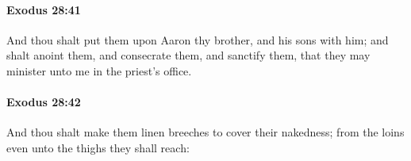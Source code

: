 		\paragraph{Exodus 28:41} %
			\label{EXODUS-28-41}

			And thou shalt put them upon Aaron thy brother, and his sons with him; and shalt anoint them, and consecrate them, and sanctify them, that they may minister unto me in the priest's office.


		\paragraph{Exodus 28:42} %
			\label{EXODUS-28-42}

			And thou shalt make them linen breeches to cover their nakedness; from the loins even unto the thighs they shall reach:


